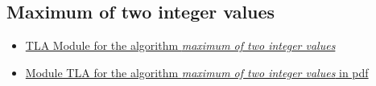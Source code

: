 \documentclass[ 12pt]{article}
\begin{document}
\subsection{Maximum of two integer values}
\label{sec:comp-sum-elem}


\begin{itemize}
\item[] 
  \href{https://mery54.github.io/mery/tla/TLAPROOFMAX2.tla}{TLA Module 
    for the algorithm \textit{ maximum of two integer values}}
\item   \href{https://mery54.github.io/mery/tla/TLAPROOFMAX2.pdf}{Module 
    TLA for the algorithm  \textit{{maximum of two integer values}}
    in pdf}
    
\end{itemize}
\end{document}
